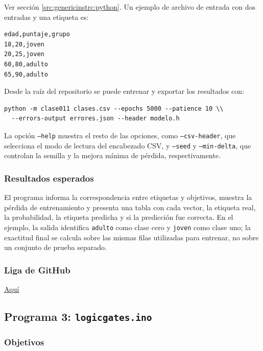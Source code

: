 \documentclass{article}[12pt,a4paper]
\begin{document}
Ver sección \ref{src:genericinstrc:python}. Un ejemplo de archivo de entrada
con dos entradas y una etiqueta es:

\begin{verbatim}
edad,puntaje,grupo
18,20,joven
20,25,joven
60,80,adulto
65,90,adulto
\end{verbatim}

Desde la raíz del repositorio se puede entrenar y exportar los resultados con:

\begin{verbatim}
python -m clase011 clases.csv --epochs 5000 --patience 10 \\
  --errors-output errores.json --header modelo.h
\end{verbatim}

La opción \texttt{--help} muestra el resto de las opciones,
como \texttt{--csv-header}, que selecciona el modo de lectura del
encabezado CSV, y \texttt{--seed} y \texttt{--min-delta},
que controlan la semilla y la mejora mínima de pérdida, respectivamente.

\subsubsection{Resultados esperados}

El programa informa la correspondencia entre etiquetas y objetivos, muestra la
pérdida de entrenamiento y presenta una tabla con cada vector, la etiqueta
real, la probabilidad, la etiqueta predicha y si la predicción fue correcta.
En el ejemplo, la salida identifica \texttt{adulto} como clase cero y
\texttt{joven} como clase uno; la exactitud final se calcula sobre las mismas
filas utilizadas para entrenar, no sobre un conjunto de prueba separado.

\subsubsection{Liga de \textbf{GitHub}}

\href{https://github.com/MarcosHCK/master-programming/tree/master/clase011}{Aquí \faGithubSquare}

\subsection{Programa 3: \texttt{logicgates.ino}}

\subsubsection{Objetivos}
\end{document}
